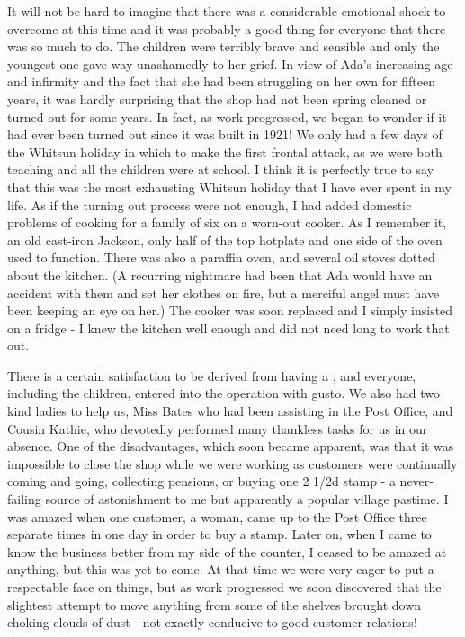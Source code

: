 It will not be hard to imagine that there was a considerable emotional shock to overcome at this time and it was probably a good thing for everyone that there was so much to do. The children were terribly brave and sensible and only the youngest one gave way unashamedly to her grief. In view of Ada's increasing age and infirmity and the fact that she had been struggling on her own for fifteen years, it was hardly surprising that the shop had not been spring cleaned or turned out for some years. In fact, as work progressed, we began to wonder if it had ever been turned out since it was built in 1921! We only had a few days of the Whitsun holiday in which to make the first frontal attack, as we were both teaching and all the children were at school. I think it is perfectly true to say that this was the most exhausting Whitsun holiday that I have ever spent in my life. As if the turning out process were not enough, I had added domestic problems of cooking for a family of six on a worn-out cooker. As I remember it, an old cast-iron Jackson, only half of the top hotplate and one side of the oven used to function. There was also a paraffin oven, and several oil stoves dotted about the kitchen. (A recurring nightmare had been that Ada would have an accident with them and set her clothes on fire, but a merciful angel must have been keeping an eye on her.) The cooker was soon replaced and I simply insisted on a fridge - I knew the kitchen well enough and did not need long to work that out.

There is a certain satisfaction to be derived from having a , and everyone, including the children, entered into the operation with gusto. We also had two kind ladies to help us, Miss Bates who had been assisting in the Post Office, and Cousin Kathie, who devotedly performed many thankless tasks for us in our absence. One of the disadvantages, which soon became apparent, was that it was impossible to close the shop while we were working as customers were continually coming and going, collecting pensions, or buying one 2 1/2d stamp - a never-failing source of astonishment to me but apparently a popular village pastime. I was amazed when one customer, a woman, came up to the Post Office three separate times in one day in order to buy a stamp. Later on, when I came to know the business better from my side of the counter, I ceased to be amazed at anything, but this was yet to come. At that time we were very eager to put a respectable face on things, but as work progressed we soon discovered that the slightest attempt to move anything from some of the shelves brought down choking clouds of dust - not exactly conducive to good customer relations!

